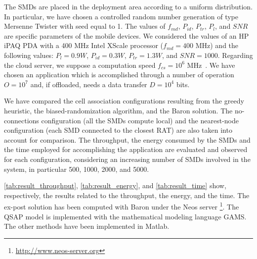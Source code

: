 \documentclass[twoside,openright]{report}
\begin{document}
The \glspl{SMD} are placed in the deployment area according to a uniform distribution. 
In particular, we have chosen a controlled random number generation of type Mersenne Twister with seed equal to 1. 
The values of $f_{\textit{md}}$, $P_{\textit{id}}$, $P_{\textit{tr}}$, $P_l$, and $\textit{SNR}$ are specific parameters of the mobile devices. 
We considered the values of an HP iPAQ PDA with a 400 MHz Intel XScale processor ($f_{\textit{md}}=400$ MHz) and the following values: $P_l = 0.9 W$, $P_{\textit{id}} = 0.3 W$, $P_{\textit{tr}} = 1.3 W$, and $\textit{SNR} = 1000$. 
Regarding the cloud server, we suppose a computation speed $f_{cs} = 10^6$ MHz~\cite{Kumar}. 
We have chosen an application which is accomplished through a number of operation $O = 10^7$ and, if offloaded, needs a data transfer $D = 10^4$ bits.

We have compared the cell association configurations resulting from the greedy heuristic, the biased-randomization algorithm, and the Baron solution. 
The no-connections configuration (all the \glspl{SMD} compute local) and the nearest-node configuration (each \gls{SMD}  connected to the closest \gls{RAT}) are also taken into account for comparison. 
The throughput, the energy consumed by the \glspl{SMD} and the time employed for accomplishing the application are evaluated and observed for each configuration, considering an increasing number of \glspl{SMD} involved in the system, in particular 500, 1000, 2000, and 5000.

\autoref{tab:result_throughput}, \autoref{tab:result_energy}, and \autoref{tab:result_time} show, respectively, the results related to the throughput, the energy, and the time. 
The ex-post solution has been computed with Baron under the Neos server \footnote{\url{http://www.neos-server.org}}. The \gls{QSAP} model is implemented with the mathematical modeling language \gls{GAMS}. The other methods have been implemented in Matlab.
\end{document}
